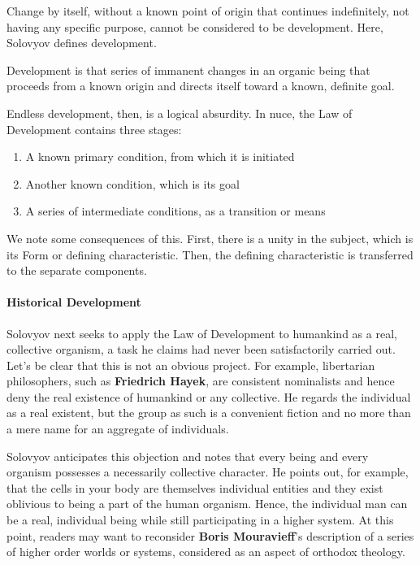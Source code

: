 Change by itself, without a known point of origin that continues indefinitely, not having any specific purpose, cannot be considered to be development. Here, Solovyov defines development.

\begin{quotex}
Development is that series of immanent changes in an organic being that proceeds from a known origin and directs itself toward a known, definite goal. 

\end{quotex}
Endless development, then, is a logical absurdity. In nuce, the Law of Development contains three stages:

\begin{enumerate}
\item A known primary condition, from which it is initiated 
\item Another known condition, which is its goal 
\item A series of intermediate conditions, as a transition or means 
\end{enumerate}
We note some consequences of this. First, there is a unity in the subject, which is its Form or defining characteristic. Then, the defining characteristic is transferred to the separate components.

\paragraph{Historical Development}
Solovyov next seeks to apply the Law of Development to humankind as a real, collective organism, a task he claims had never been satisfactorily carried out. Let's be clear that this is not an obvious project. For example, libertarian philosophers, such as \textbf{Friedrich Hayek}, are consistent nominalists and hence deny the real existence of humankind or any collective. He regards the individual as a real existent, but the group as such is a convenient fiction and no more than a mere name for an aggregate of individuals.

Solovyov anticipates this objection and notes that every being and every organism possesses a necessarily collective character. He points out, for example, that the cells in your body are themselves individual entities and they exist oblivious to being a part of the human organism. Hence, the individual man can be a real, individual being while still participating in a higher system. At this point, readers may want to reconsider \textbf{Boris Mouravieff}'s description of a series of higher order worlds or systems, considered as an aspect of orthodox theology.

